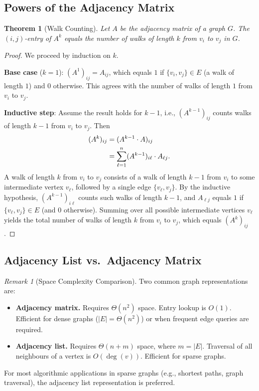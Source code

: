 \documentclass[12pt,a4paper]{article}
\theoremstyle{definition}
\theoremstyle{plain}
\newtheorem{theorem}{Theorem}[section]
\theoremstyle{remark}
\newtheorem{remark}{Remark}[section]
\begin{document}
\subsection{Powers of the Adjacency Matrix}

\begin{theorem}[Walk Counting]\label{thm:adj-power}
Let $A$ be the adjacency matrix of a graph $G$. The $(i,j)$-entry of $A^k$ equals the
number of walks of length $k$ from $v_i$ to $v_j$ in $G$.
\end{theorem}

\begin{proof}
We proceed by induction on $k$.

\textbf{Base case} ($k = 1$): $(A^1)_{ij} = A_{ij}$, which equals $1$ if $\{v_i,v_j\}
\in E$ (a walk of length $1$) and $0$ otherwise. This agrees with the number of walks
of length $1$ from $v_i$ to $v_j$.

\textbf{Inductive step}: Assume the result holds for $k - 1$, i.e., $(A^{k-1})_{ij}$
counts walks of length $k-1$ from $v_i$ to $v_j$. Then
\begin{align}
  (A^k)_{ij} &= (A^{k-1} \cdot A)_{ij} \notag\\
             &= \sum_{\ell=1}^{n} (A^{k-1})_{i\ell} \cdot A_{\ell j}. \label{eq:matrix-mult}
\end{align}
A walk of length $k$ from $v_i$ to $v_j$ consists of a walk of length $k-1$ from $v_i$
to some intermediate vertex $v_\ell$, followed by a single edge $\{v_\ell, v_j\}$.
By the inductive hypothesis, $(A^{k-1})_{i\ell}$ counts such walks of length $k-1$,
and $A_{\ell j}$ equals $1$ if $\{v_\ell, v_j\} \in E$ (and $0$ otherwise). Summing
over all possible intermediate vertices $v_\ell$ yields the total number of walks of
length $k$ from $v_i$ to $v_j$, which equals $(A^k)_{ij}$.
\end{proof}

\subsection{Adjacency List vs.\ Adjacency Matrix}

\begin{remark}[Space Complexity Comparison]\label{rem:adj-list-vs-matrix}
Two common graph representations are:
\begin{itemize}
  \item \textbf{Adjacency matrix.} Requires $\Theta(n^2)$ space. Entry lookup is $O(1)$.
        Efficient for dense graphs ($|E| = \Theta(n^2)$) or when frequent edge queries
        are required.
  \item \textbf{Adjacency list.} Requires $\Theta(n + m)$ space, where $m = |E|$.
        Traversal of all neighbours of a vertex is $O(\deg(v))$. Efficient for sparse
        graphs.
\end{itemize}
For most algorithmic applications in sparse graphs (e.g., shortest paths, graph
traversal), the adjacency list representation is preferred.
\end{remark}
\end{document}
